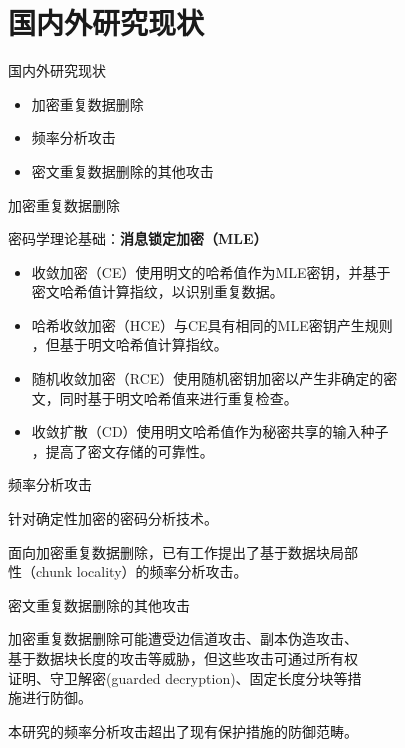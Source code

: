 \documentclass[aspectratio=43]{beamer}
\begin{document}
\section{国内外研究现状}

\begin{frame}{国内外研究现状}
\begin{card}
\begin{itemize}
    \item 加密重复数据删除
    \item 频率分析攻击
    \item 密文重复数据删除的其他攻击
\end{itemize}
\end{card}
\end{frame}

\begin{frame}{加密重复数据删除}
\begin{card}
密码学理论基础：\textbf{消息锁定加密（MLE）}
\end{card}

\begin{itemize}
    \item 收敛加密（CE）使用明文的哈希值作为MLE密钥，并基于\\[2mm]密文哈希值计算指纹，以识别重复数据。
    \item 哈希收敛加密（HCE）与CE具有相同的MLE密钥产生规则\\[2mm]，但基于明文哈希值计算指纹。
    \item 随机收敛加密（RCE）使用随机密钥加密以产生非确定的密\\[2mm]文，同时基于明文哈希值来进行重复检查。
    \item 收敛扩散（CD）使用明文哈希值作为秘密共享的输入种子\\[2mm]，提高了密文存储的可靠性。
\end{itemize}

\end{frame}

\begin{frame}{频率分析攻击}
\begin{card}
针对确定性加密的密码分析技术。
\end{card}
\begin{card}
面向加密重复数据删除，已有工作提出了基于数据块局部\\[2mm]性（chunk locality）的频率分析攻击。
\end{card}
\end{frame}

\begin{frame}{密文重复数据删除的其他攻击}
\begin{card}
加密重复数据删除可能遭受边信道攻击、副本伪造攻击、\\[2mm]
基于数据块长度的攻击等威胁，但这些攻击可通过所有权\\[2mm]
证明、守卫解密(guarded decryption)、固定长度分块等措\\[2mm]施进行防御。
\end{card}
\begin{card}
本研究的频率分析攻击超出了现有保护措施的防御范畴。
\end{card}
\end{frame}
\end{document}
